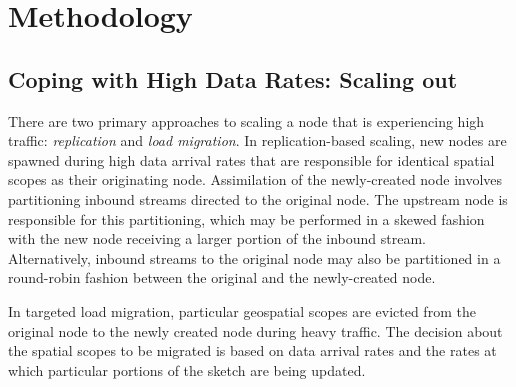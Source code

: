 
\section{Methodology}
\label{sec:methodology}




\subsection{Coping with High Data Rates: Scaling out}
\label{subsec:scaling-out}
There are two primary approaches to scaling a node that is experiencing high traffic: \emph{replication} and \emph{load migration}. In replication-based scaling, new nodes are spawned during high data arrival rates that are responsible for identical spatial scopes as their originating node. Assimilation of the newly-created node involves partitioning inbound streams directed to the original node. The upstream node is responsible for this partitioning, which may be performed in a skewed fashion with the new node receiving a larger portion of the inbound stream.  Alternatively, inbound streams to the original node may also be partitioned in a round-robin fashion between the original and the newly-created node.

In targeted load migration, particular geospatial scopes are evicted from the original node to the newly created node during heavy traffic. The decision about the spatial scopes to be migrated is based on data arrival rates and the rates at which particular portions of the sketch are being updated.


